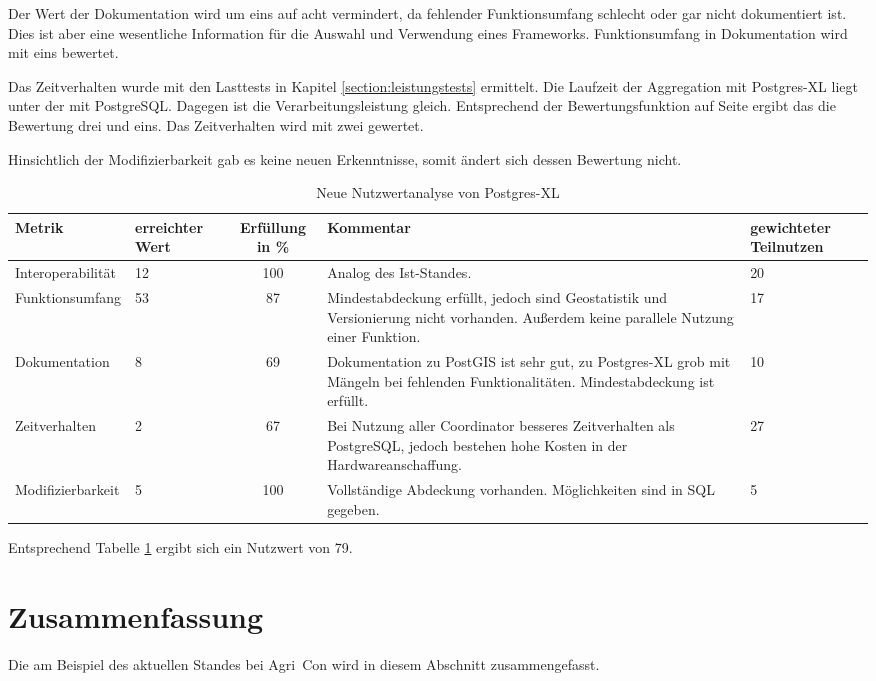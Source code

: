 Der Wert der Dokumentation wird um eins auf acht vermindert, da fehlender Funktionsumfang schlecht oder gar nicht dokumentiert ist.
Dies ist aber eine wesentliche Information für die Auswahl und Verwendung eines Frameworks.
Funktionsumfang in Dokumentation wird mit eins bewertet.

Das Zeitverhalten wurde mit den Lasttests in Kapitel \ref{section:leistungstests} ermittelt.
Die Laufzeit der Aggregation mit Postgres-XL liegt unter der mit PostgreSQL.
Dagegen ist die Verarbeitungsleistung gleich.
Entsprechend der Bewertungsfunktion auf Seite \pageref{bf:zeitverhalten} ergibt das die Bewertung drei und eins.
Das Zeitverhalten wird mit zwei gewertet.

Hinsichtlich der Modifizierbarkeit gab es keine neuen Erkenntnisse, somit ändert sich dessen Bewertung nicht.

\begin{table}[h!]
\centering
\small
\begin{tabular}{l|p{1.8cm}|c|p{3.1cm}|p{1.8cm}}
\textbf{Metrik} & \textbf{erreichter Wert} & \textbf{Erfüllung in \%} & \textbf{Kommentar} & \textbf{gewichteter Teilnutzen} \\ \hline
Interoperabilität & 12 & 100 & Analog des Ist-Standes. & 20 \\ \hline
Funktionsumfang & 53 & 87 & Mindestabdeckung erfüllt, jedoch sind Geostatistik und Versionierung nicht vorhanden. Außerdem keine parallele Nutzung einer Funktion. & 17 \\ \hline
Dokumentation & 8 & 69 & Dokumentation zu PostGIS ist sehr gut, zu Postgres-XL grob mit Mängeln bei fehlenden Funktionalitäten. Mindestabdeckung ist erfüllt. & 10 \\ \hline
Zeitverhalten & 2 & 67 & Bei Nutzung aller Coordinator besseres Zeitverhalten als PostgreSQL, jedoch bestehen hohe Kosten in der Hardwareanschaffung. & 27 \\ \hline
Modifizierbarkeit & 5 & 100 & Vollständige Abdeckung vorhanden. Möglichkeiten sind in SQL gegeben. & 5 \\
\end{tabular}
\caption{Neue Nutzwertanalyse von Postgres-XL}
\label{table:nutzwertanalyse2-postgresxl}
\end{table}
Entsprechend Tabelle \ref{table:nutzwertanalyse2-postgresxl} ergibt sich ein Nutzwert von 79.

\section{Zusammenfassung}
Die \titel{} am Beispiel des aktuellen Standes bei Agri~Con wird in diesem Abschnitt zusammengefasst.

